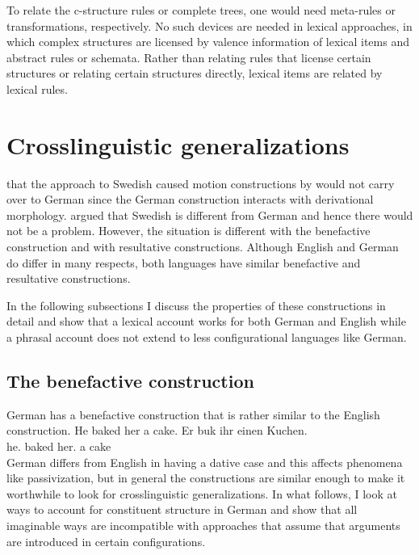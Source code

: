 To relate the c-structure rules or complete trees, one would need meta-rules or transformations, respectively. No such devices are
needed in lexical approaches, in which complex structures are licensed by valence information of
lexical items and abstract rules or schemata.
Rather than relating rules that license certain structures or relating certain structures directly,
lexical items are related by lexical rules.

\chapter{Crosslinguistic generalizations}
\label{sec-generalizations}


 that the approach to Swedish caused motion constructions by
\citet*{ADT2008a,ADT2013a} would not carry over to German since the German construction interacts with derivational
morphology. \citet{AT2014a} argued that Swedish is different from German and hence there would not
be a problem. However, the situation is different with the benefactive construction and with
resultative constructions. Although English and German do differ in many respects, both languages
have similar benefactive and resultative constructions.

In the following subsections I discuss the properties of these constructions in detail and show that
a lexical account works for both German and English while a phrasal account does not extend to less
configurational languages like German.

\section{The benefactive construction}

German has a benefactive construction that is rather similar to the English construction. 
\eal
\ex He baked her a cake.
\ex
\label{ex-er-buk-ihr-einen-kuchen} 
\gll Er buk   ihr        einen Kuchen.\\
     he.\nom{} baked her.\dat{} a cake\\
\zl
German differs from English in having a dative case and this affects phenomena like passivization, but in
general the constructions are similar enough to make it worthwhile to look for crosslinguistic
generalizations.
In what follows, I look at ways to account for constituent structure in German and show that all
imaginable ways are incompatible with approaches that assume that arguments are introduced in
certain configurations.

